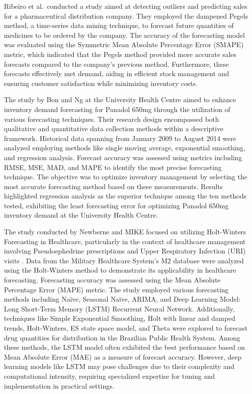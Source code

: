 \documentclass[
  authoryear,
  preprint,
  3p]{elsarticle}
\begin{document}
Ribeiro et al.~conducted a study aimed at detecting outliers and
predicting sales for a pharmaceutical distribution company. They
employed the dampened Pegels method, a time-series data mining
technique, to forecast future quantities of medicines to be ordered by
the company\citep[ribeiro2017improving]{article}. The accuracy of the
forecasting model was evaluated using the Symmetric Mean Absolute
Percentage Error (SMAPE) metric, which indicated that the Pegels method
provided more accurate sales forecasts compared to the company's
previous method. Furthermore, these forecasts effectively met demand,
aiding in efficient stock management and ensuring customer satisfaction
while minimizing inventory costs.

The study by Bon and Ng at the University Health Centre aimed to enhance
inventory demand forecasting for Panadol 650mg through the utilization
of various forecasting techniques. Their research design encompassed
both qualitative and quantitative data collection methods within a
descriptive framework. Historical data spanning from January 2009 to
August 2014 were analyzed employing methods like single moving average,
exponential smoothing, and regression analysis. Forecast accuracy was
assessed using metrics including RMSE, MSE, MAD, and MAPE to identify
the most precise forecasting technique. The objective was to optimize
inventory management by selecting the most accurate forecasting method
based on these measurements\citep{bon2017optimization}. Results
highlighted regression analysis as the superior technique among the ten
methods tested, exhibiting the least forecasting error for optimizing
Panadol 650mg inventory demand at the University Health
Centre\citep[bon2017optimization]{inproceedings}.

The study conducted by Newberne and MIKE focused on utilizing
Holt-Winters Forecasting in Healthcare, particularly in the context of
healthcare management involving Pseudoephedrine prescriptions and Upper
Respiratory Infection (URI) visits \citep{newberne2006holt}. Data from
the Military Healthcare System's M2 database were analyzed using the
Holt-Winters method to demonstrate its applicability in healthcare
forecasting. Forecasting accuracy was assessed using the Mean Absolute
Percentage Error (MAPE) metric. The study employed various forecasting
methods including Naïve, Seasonal Naïve, ARIMA, and Deep Learning Model:
Long Short-Term Memory (LSTM) Recurrent Neural Network. Additionally,
techniques like Simple Exponential Smoothing, Holt with linear and
damped trends, Holt-Winters, ES state space model, and Theta were
explored to forecast drug quantities for distribution in the Brazilian
Public Health System. Among these methods, the LSTM model often
exhibited the best performance based on Mean Absolute Error (MAE) as a
measure of forecast accuracy. However, deep learning models like LSTM
may pose challenges due to their complexity and computational intensity,
requiring specialized expertise for tuning and implementation in
practical settings.
\end{document}
